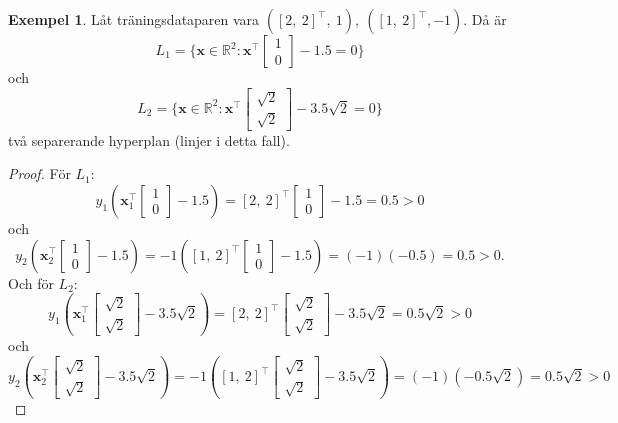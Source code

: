 \documentclass[a4paper, 12pt]{report}
\theoremstyle{definition}
\newtheorem{ex}{Exempel}[section]
\theoremstyle{remark}
\begin{document}
\begin{ex}\label{exempel:mångahyperplan}
	Låt träningsdataparen vara $(\left[2,~2\right]^\intercal,~1),~(\left[1,~2\right]^\intercal,-1)$. Då är $$L_1=\{\mathbf{x}\in\mathbb{R}^2: \mathbf{x}^\intercal\begin{bmatrix}
	1\\
	0
	\end{bmatrix} - 1.5=0\}$$ och $$L_2=\{\mathbf{x}\in\mathbb{R}^2: \mathbf{x}^\intercal\begin{bmatrix}
	\sqrt{2}\\
	\sqrt{2}
	\end{bmatrix} - 3.5\sqrt{2}=0\}$$ två separerande hyperplan (linjer i detta fall).
\end{ex}
\begin{proof}
	För $L_1$: $$y_1(\mathbf{x}_1^\intercal\begin{bmatrix}
	1\\
	0\end{bmatrix}-1.5)=\left[2,~2\right]^\intercal\begin{bmatrix}
	1\\
	0\end{bmatrix}-1.5=0.5>0$$ och $$y_2(\mathbf{x}_2^\intercal\begin{bmatrix}
	1\\
	0\end{bmatrix}-1.5)=-1(\left[1,~2\right]^\intercal\begin{bmatrix}
	1\\
	0\end{bmatrix}-1.5)=(-1)(-0.5)=0.5>0.$$
	Och för $L_2$: $$y_1(\mathbf{x}_1^\intercal\begin{bmatrix}
	\sqrt{2}\\
	\sqrt{2}\end{bmatrix}-3.5\sqrt{2})=\left[2,~2\right]^\intercal\begin{bmatrix}
	\sqrt{2}\\
	\sqrt{2}\end{bmatrix}-3.5\sqrt{2}=0.5\sqrt{2}>0$$ och $$y_2(\mathbf{x}_2^\intercal\begin{bmatrix}
	\sqrt{2}\\
	\sqrt{2}\end{bmatrix}-3.5\sqrt{2})=-1(\left[1,~2\right]^\intercal\begin{bmatrix}
	\sqrt{2}\\
	\sqrt{2}\end{bmatrix}-3.5\sqrt{2})=(-1)(-0.5\sqrt{2})=0.5\sqrt{2}>0$$
\end{proof}
\end{document}
